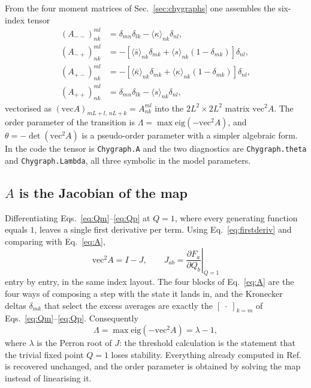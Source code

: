 \documentclass[aps,pre,twocolumn,superscriptaddress,floatfix,longbibliography]{revtex4-2}
\newcommand{\ave}[1]{\langle #1 \rangle}
\newcommand{\vecA}{\mathrm{vec}^2 A}
\newcommand{\code}[1]{\texttt{#1}}
\begin{document}
From the four moment matrices of Sec.~\ref{sec:chygraphs} one assembles the
six-index tensor \cite{vazquez2024comnet}
\begin{align}
  (A_{--})^{ml}_{nk} &= \delta_{mn}\delta_{lk}-\ave{\kappa}_{nk}\delta_{nl},
  \nonumber\\
  (A_{-+})^{ml}_{nk} &= -\left[\ave{\bar s}_{nk}\delta_{mk}
                        +\ave{s}_{nk}(1-\delta_{mk})\right]\delta_{nl},
  \nonumber\\
  (A_{+-})^{ml}_{nk} &= -\left[\ave{\bar\kappa}_{nk}\delta_{mk}
                        +\ave{\kappa}_{nk}(1-\delta_{mk})\right]\delta_{nl},
  \nonumber\\
  (A_{++})^{ml}_{nk} &= \delta_{mn}\delta_{lk}-\ave{s}_{nk}\delta_{nl},
  \label{eq:A}
\end{align}
vectorised as $(\mathrm{vec}A)_{mL+l,\,nL+k}=A^{ml}_{nk}$ into the
$2L^2\times2L^2$ matrix $\vecA$. The order parameter of the transition is
$\Lambda=\max\mathrm{eig}(-\vecA)$, and $\theta=-\det(\vecA)$ is a
pseudo-order parameter with a simpler algebraic form. In the code the tensor is
\code{Chygraph.A} and the two diagnostics are \code{Chygraph.theta} and
\code{Chygraph.Lambda}, all three symbolic in the model parameters.

\subsection{$A$ is the Jacobian of the map}

Differentiating Eqs.~\eqref{eq:Qm}--\eqref{eq:Qp} at $Q=1$, where every
generating function equals $1$, leaves a single first derivative per term. Using
Eq.~\eqref{eq:firstderiv} and comparing with Eq.~\eqref{eq:A},
\begin{equation}
  \boxed{\;\vecA = I - J,\qquad
  J_{ab}=\left.\frac{\partial F_a}{\partial Q_b}\right|_{Q=1}\;}
  \label{eq:AisJ}
\end{equation}
entry by entry, in the same index layout. The four blocks of Eq.~\eqref{eq:A}
are the four ways of composing a step with the state it lands in, and the
Kronecker deltas $\delta_{mk}$ that select the excess averages are exactly the
$[\;\cdot\;]_{k=m}$ of Eqs.~\eqref{eq:Qm}--\eqref{eq:Qp}. Consequently
\begin{equation}
  \Lambda=\max\mathrm{eig}(-\vecA)=\lambda-1,
\end{equation}
where $\lambda$ is the Perron root of $J$: the threshold calculation is the
statement that the trivial fixed point $Q=1$ loses stability. Everything already
computed in Ref.~\cite{vazquez2024comnet} is recovered unchanged, and the order
parameter is obtained by solving the map instead of linearising it.
\end{document}
